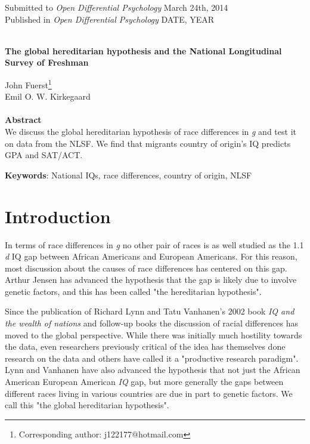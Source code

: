 \documentclass[a4paper,12pt]{article}
\begin{document}
\noindent
Submitted to \textit{Open Differential Psychology} March 24th, 2014\\
Published in \textit{Open Differential Psychology} DATE, YEAR\\
\\
\begin{center}
\textbf{{\Huge The global hereditarian hypothesis and the National Longitudinal Survey of Freshman}}
\end{center}
\noindent\Large John Fuerst\footnote{Corresponding author: j122177@hotmail.com}\\

\noindent\Large Emil O. W. Kirkegaard\\
\\
\normalsize\textbf{Abstract}\\
We discuss the global hereditarian hypothesis of race differences in \textit{g} and test it on data from the NLSF. We find that migrants country of origin's IQ predicts GPA and SAT/ACT.

\noindent\textbf{Keywords}: National IQs, race differences, country of origin, NLSF

\section{Introduction}
In terms of race differences in \textit{g} no other pair of races is as well studied as the 1.1 \textit{d} IQ gap between African Americans and European  Americans\cite{roth2001ethnic}. For this reason, most discussion about the causes of race differences has centered on this gap\cite{rushton2005thirty}. Arthur Jensen has advanced the hypothesis that the gap is likely due to involve genetic factors, and this has been called "the hereditarian hypothesis"\cite{jensen1969much,jenseneducability,jensen1998g,rushton2005thirty}.

Since the publication of Richard Lynn and Tatu Vanhanen's 2002 book \textit{IQ and the wealth of nations} and follow-up books the discussion of racial differences has moved to the global perspective\cite{lynn2002iq,lynn2006iq,lynn2006race,lynn2008global,lynn2012intelligence}. While there was initially much hostility towards the data, even researchers previously critical of the idea has themselves done research on the data\cite{hunt2006sorry,hunt2012makes} and others have called it a "productive research paradigm"\cite{rindermann2013intelligence}. Lynn and Vanhanen have also advanced the hypothesis that not just the African American European American \textit{IQ} gap, but more generally the gaps between different races living in various countries are due in part to genetic factors. We call this "the global hereditarian hypothesis".
\end{document}
